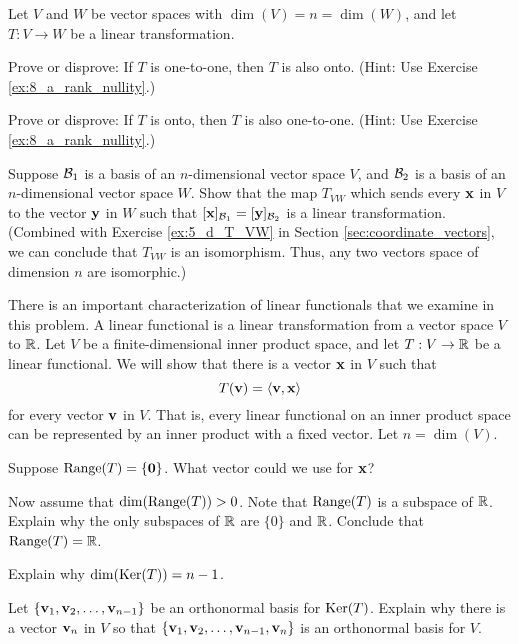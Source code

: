 \item  Let $V$ and $W$ be vector spaces with $\dim(V) = n = \dim(W)$, and let $T: V \to W$ be a linear transformation.
	\ba
	\item Prove or disprove: If $T$ is one-to-one, then $T$ is also onto. (Hint: Use Exercise  \ref{ex:8_a_rank_nullity}.)
	
	\item Prove or disprove: If $T$ is onto, then $T$ is also one-to-one. (Hint: Use Exercise  \ref{ex:8_a_rank_nullity}.)
 
 	\ea

\item Suppose $\mathcal{B}_1$ is a basis of an $n$-dimensional  vector space $V$, and $\mathcal{B}_2$ is a basis of an $n$-dimensional vector space $W$. Show that the map $T_{VW}$ which sends every $\mathbf{x}$ in $V$ to the vector $\mathbf{y}$ in $W$ such that $[\mathbf{x}]_{\mathcal{B}_1} = [\mathbf{y}]_{\mathcal{B}_2}$ is a linear transformation. (Combined with Exercise \ref{ex:5_d_T_VW} in Section \ref{sec:coordinate_vectors}, we can conclude that $T_{VW}$ is an isomorphism. Thus, any two vectors space of dimension $n$ are isomorphic.)

\item There is an important characterization of linear functionals that we examine in this problem. A linear functional is a linear transformation from a vector space $V$ to $\mathbb{R}$. Let $V$ be a finite-dimensional inner product space, and let $T: V \to \mathbb{R}$ be a linear functional. We will show that there is a vector $\mathbf{x}$ in $V$ such that 
\[T(\mathbf{v}) = \langle \mathbf{v}, \mathbf{x} \rangle\]
for every vector $\mathbf{v}$ in $V$. That is, every linear functional on an inner product space can be represented by an inner product with a fixed vector. Let $n = \dim(V)$. 
 
 \ba
 \item Suppose $\text{Range}(T) = \{\mathbf{0}\}$. What vector could we use for $\mathbf{x}$?
 
 \item Now assume that $\dim(\text{Range}(T)) > 0$. Note that $\text{Range}(T)$ is a subspace of $\mathbb{R}$. Explain why the only subspaces of $\mathbb{R}$ are $\{0\}$ and $\mathbb{R}$. Conclude that $\text{Range}(T) = \mathbb{R}$. 
 
\item Explain why $\dim(\text{Ker}(T)) = n-1$. 

 
 \item Let $\{\mathbf{v}_1, \mathbf{v}_2, \ldots, \mathbf{v}_{n-1}\}$ be an orthonormal basis for $\text{Ker}(T)$. Explain why there is a vector $\mathbf{v}_n$ in $V$ so that $\{\mathbf{v}_1, \mathbf{v}_2, \ldots, \mathbf{v}_{n-1}, \mathbf{v}_n\}$ is an orthonormal basis for $V$.
 
